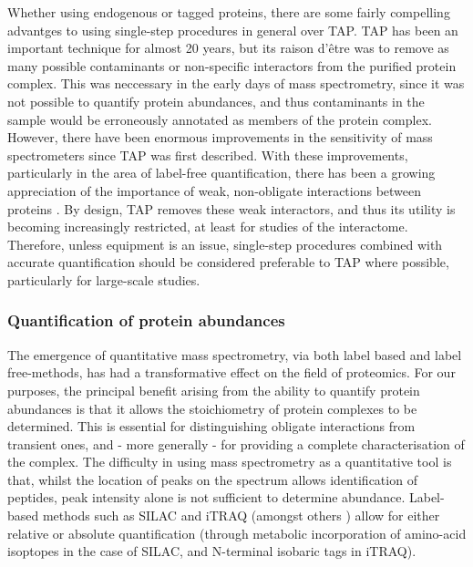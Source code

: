 \documentclass[a4paper,11pt,twoside,openright]{scrbook}
\begin{document}
Whether using endogenous or tagged proteins, there are some fairly compelling advantges to using single-step procedures in general over TAP. TAP has been an important technique for almost 20 years, but its raison d'être was to remove as many possible contaminants or non-specific interactors from the purified protein complex. This was neccessary in the early days of mass spectrometry, since it was not possible to quantify protein abundances, and thus contaminants in the sample would be erroneously annotated as members of the protein complex. However, there have been enormous improvements in the sensitivity of mass spectrometers since TAP was first described. With these improvements, particularly in the area of label-free quantification, there has been a growing appreciation of the importance of weak, non-obligate interactions between proteins \cite{Perkins2010a,Hein2015}. By design, TAP removes these weak interactors, and thus its utility is becoming increasingly restricted, at least for studies of the interactome. Therefore, unless equipment is an issue, single-step procedures combined with accurate quantification should be considered preferable to TAP where possible, particularly for large-scale studies.

\subsubsection{Quantification of protein abundances}
The emergence of quantitative mass spectrometry, via both label based and label free-methods, has had a transformative effect on the field of proteomics. For our purposes, the principal benefit arising from the ability to quantify protein abundances is that it allows the stoichiometry of protein complexes to be determined. This is essential for distinguishing obligate interactions from transient ones, and - more generally - for providing a complete characterisation of the complex. The difficulty in using mass spectrometry as a quantitative tool is that, whilst the location of peaks on the spectrum allows identification of peptides, peak intensity alone is not sufficient to determine abundance. Label-based methods such as SILAC \cite{Ong2002a} and iTRAQ \cite{Ross2004} (amongst others \cite{Gygi1999,Thompson2003}) allow for either relative or absolute quantification (through metabolic incorporation of amino-acid isoptopes in the case of SILAC, and N-terminal isobaric tags in iTRAQ).
\end{document}
